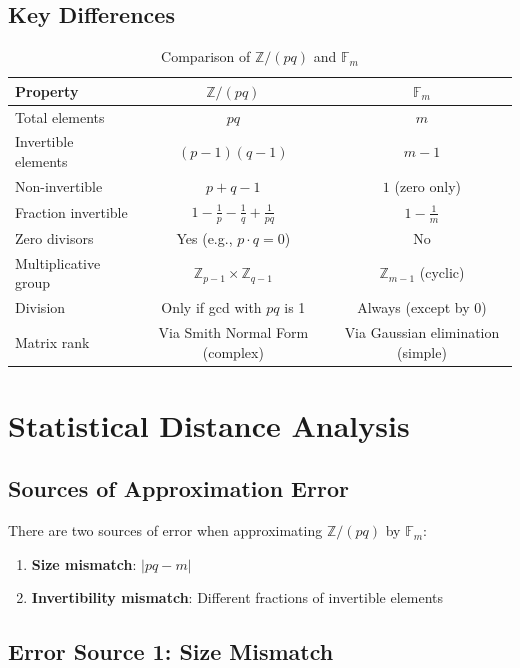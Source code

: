 \documentclass[11pt]{article}
\theoremstyle{definition}
\begin{document}
\subsection{Key Differences}

\begin{table}[h]
\centering
\begin{tabular}{@{}lcc@{}}
\toprule
\textbf{Property} & $\mathbb{Z}/(pq)$ & $\mathbb{F}_m$ \\ 
\midrule
Total elements & $pq$ & $m$ \\
Invertible elements & $(p-1)(q-1)$ & $m-1$ \\
Non-invertible & $p+q-1$ & $1$ (zero only) \\
Fraction invertible & $1 - \frac{1}{p} - \frac{1}{q} + \frac{1}{pq}$ & $1 - \frac{1}{m}$ \\
Zero divisors & Yes (e.g., $p \cdot q = 0$) & No \\
Multiplicative group & $\mathbb{Z}_{p-1} \times \mathbb{Z}_{q-1}$ & $\mathbb{Z}_{m-1}$ (cyclic) \\
Division & Only if gcd with $pq$ is 1 & Always (except by 0) \\
Matrix rank & Via Smith Normal Form (complex) & Via Gaussian elimination (simple) \\
\bottomrule
\end{tabular}
\caption{Comparison of $\mathbb{Z}/(pq)$ and $\mathbb{F}_m$}
\end{table}

\section{Statistical Distance Analysis}

\subsection{Sources of Approximation Error}

There are two sources of error when approximating $\mathbb{Z}/(pq)$ by $\mathbb{F}_m$:

\begin{enumerate}
\item \textbf{Size mismatch}: $|pq - m|$
\item \textbf{Invertibility mismatch}: Different fractions of invertible elements
\end{enumerate}

\subsection{Error Source 1: Size Mismatch}
\end{document}
